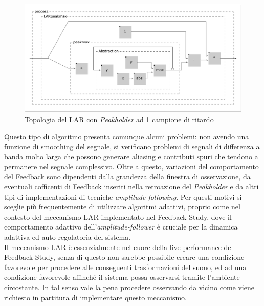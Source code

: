 \begin{figure}[h!]
\begin{center}
    \includegraphics[width=14cm]{figures/LARpeakmax.pdf} 
    \caption{Topologia del LAR con \textit{Peakholder} ad 1 campione di ritardo} 
\end{center}
\vspace{0.5cm}
\end{figure} 

Questo tipo di algoritmo presenta comunque alcuni problemi: non avendo
una funzione di smoothing del segnale, si verificano problemi di segnali di differenza a banda
molto larga che possono generare aliasing e contributi spuri che tendono a permanere nel
segnale complessivo.
Oltre a questo, variazioni del comportamento del Feedback sono dipendenti dalla grandezza
della finestra di osservazione, da eventuali cofficenti di Feedback inseriti nella
retroazione del \textit{Peakholder} e da altri tipi di implementazioni di tecniche 
\textit{amplitude-following}. Per questi motivi si sceglie più frequentemente di utilizzare algoritmi
adattivi, proprio come nel contesto del meccanismo LAR implementato nel Feedback Study,
dove il comportamento adattivo dell'\textit{amplitude-follower} è cruciale
per la dinamica adattiva ed auto-regolatoria del sistema.\\
Il meccanismo LAR è essenzialmente nel cuore della live performance del Feedback Study,
senza di questo non sarebbe possibile creare una condizione favorevole per procedere alle 
conseguenti trasformazioni del suono, ed ad una condizione favorevole affinché il 
sistema possa osservarsi tramite l'ambiente circostante. 
In tal senso vale la pena procedere osservando da vicino come viene richiesto in partitura 
di implementare questo meccanismo.

